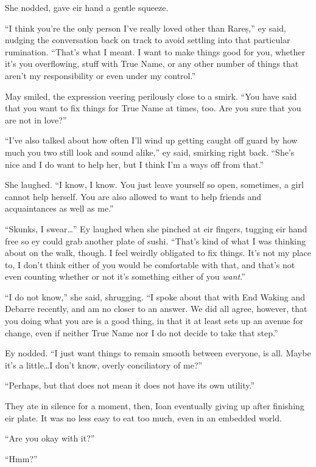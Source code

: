 She nodded, gave eir hand a gentle squeeze.

``I think you're the only person I've really loved other than Rareș,'' ey said, nudging the conversation back on track to avoid settling into that particular rumination. ``That's what I meant. I want to make things good for you, whether it's you overflowing, stuff with True Name, or any other number of things that aren't my responsibility or even under my control.''

May smiled, the expression veering perilously close to a smirk. ``You have said that you want to fix things for True Name at times, too. Are you sure that you are not in love?''

``I've also talked about how often I'll wind up getting caught off guard by how much you two still look and sound alike,'' ey said, smirking right back. ``She's nice and I do want to help her, but I think I'm a ways off from that.''

She laughed. ``I know, I know. You just leave yourself so open, sometimes, a girl cannot help herself. You are also allowed to want to help friends and acquaintances as well as me.''

``Skunks, I swear\ldots{}'' Ey laughed when she pinched at eir fingers, tugging eir hand free so ey could grab another plate of sushi. ``That's kind of what I was thinking about on the walk, though. I feel weirdly obligated to fix things. It's not my place to, I don't think either of you would be comfortable with that, and that's not even counting whether or not it's something either of you \emph{want}.''

``I do not know,'' she said, shrugging. ``I spoke about that with End Waking and Debarre recently, and am no closer to an answer. We did all agree, however, that you doing what you are is a good thing, in that it at least sets up an avenue for change, even if neither True Name nor I do not decide to take that step.''

Ey nodded. ``I just want things to remain smooth between everyone, is all. Maybe it's a little\ldots I don't know, overly conciliatory of me?''

``Perhaps, but that does not mean it does not have its own utility.''

They ate in silence for a moment, then, Ioan eventually giving up after finishing eir plate. It was no less easy to eat too much, even in an embedded world.

``Are you okay with it?''

``Hmm?''

